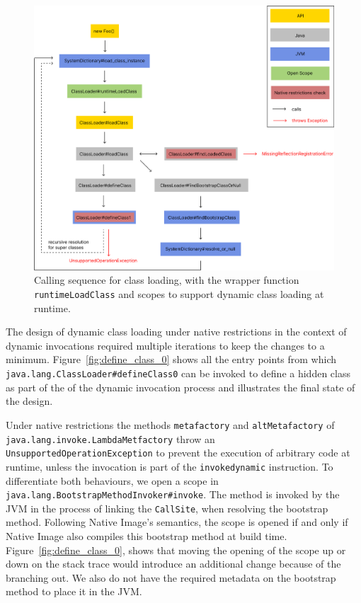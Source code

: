 
\begin{figure}
    \centering
    \includegraphics[scale=0.5]{resources/Group 412.png}
    \caption{Calling sequence for class loading, with the wrapper function \texttt{runtimeLoadClass} and scopes to support dynamic class loading at runtime.}
    \label{fig:load_class}
\end{figure}

The design of dynamic class loading under native restrictions in the context of dynamic invocations required multiple iterations to keep the changes to a minimum. Figure~\ref{fig:define_class_0} shows all the entry points from which \verb|java.lang.ClassLoader#defineClass0| can be invoked to define a hidden class as part of the of the dynamic invocation process and illustrates the final state of the design. 

Under native restrictions the methods \verb|metafactory| and \verb|altMetafactory| of \verb|java.lang.invoke.LambdaMetfactory| throw an \verb|UnsupportedOperationException| to prevent the execution of arbitrary code at runtime, unless the invocation is part of the \verb|invokedynamic| instruction.
To differentiate both behaviours, we open a scope in \verb|java.lang.BootstrapMethodInvoker#invoke|. The method is invoked by the JVM in the process of linking the \verb|CallSite|, when resolving the bootstrap method. Following Native Image's semantics, the scope is opened if and only if Native Image also compiles this bootstrap method at build time. Figure~\ref{fig:define_class_0}, shows that moving the opening of the scope up or down on the stack trace would introduce an additional change because of the branching out. We also do not have the required metadata on the bootstrap method to place it in the JVM.

